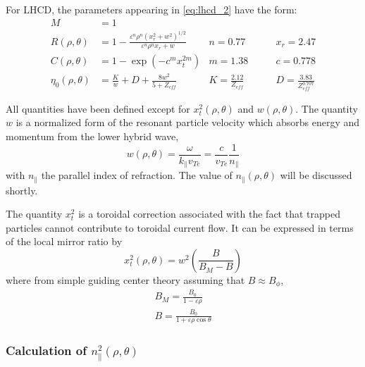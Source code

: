For LHCD, the parameters appearing in \cref{eq:lhcd_2} have the form:
\begin{align}
	M &= 1 & &\qquad \\
	R ( \rho , \theta ) &= 1 - \frac { \varepsilon ^ { n } \rho ^ { n } \left( x _ { r } ^ { 2 } + w ^ { 2 } \right) ^ { 1 / 2 } } { \varepsilon ^ { n } \rho ^ { n } x _ { r } + w }  & n = 0.77 &\qquad x _ { r } = 2.47 \\
	C ( \rho , \theta ) &= 1 - \exp \left( - c ^ { m } x _ { t } ^ { 2 m } \right) & m = 1.38 &\qquad c = 0.778 \\
	\eta _ { 0 } ( \rho , \theta ) &= \frac { K } { w } + D + \frac { 8 w ^ { 2 } } { 5 + Z _ { c f f } } & K = \frac { 2.12 } { Z _ { eff } } &\qquad D = \frac { 3.83 } { Z _ { eff } ^ { 0.707 } }
\end{align}

All quantities have been defined except for $x_t^2(\rho,\theta)$ and $w(\rho,\theta)$. The quantity $w$ is a normalized form of the resonant particle velocity which absorbs energy and momentum from the lower hybrid wave,
\begin{equation}
	w ( \rho , \theta ) = \frac { \omega } { k _ { \| } v _ { T e } } = \frac { c } { v _ { Te } } \frac { 1 } { n _ { \| } }
\end{equation}
with $n_\parallel$ the parallel index of refraction. The value of $n_\parallel(\rho,\theta)$ will be discussed shortly.

The quantity $x_t^2$ is a toroidal correction associated with the fact that trapped particles cannot contribute to toroidal current flow. It can be expressed in terms of the local mirror ratio by
\begin{equation}
	x _ { t } ^ { 2 } ( \rho , \theta ) = w ^ { 2 } \left( \frac { B } { B _ { M } - B } \right)
\end{equation}
where from simple guiding center theory assuming that $B \approx B_\phi$,
\begin{gather}
	B _ { M } = \frac { B _ { 0 } } { 1 - \varepsilon \rho } \\
	B = \frac { B _ { 0 } } { 1 + \varepsilon \rho \cos \theta }
\end{gather}

\subsubsection{Calculation of $n_\parallel^2(\rho,\theta)$}

